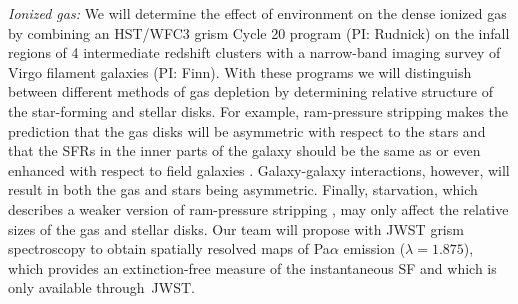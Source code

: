 \documentclass[11pt]{article}
\begin{document}

\textit{Ionized gas:} We will determine the effect of environment on the dense ionized
gas by combining an HST/WFC3 grism Cycle 20 program
(PI: Rudnick) on the infall regions of 4 intermediate redshift
clusters with a narrow-band imaging survey of Virgo filament galaxies (PI: Finn).  With these programs
we will distinguish between different methods of gas depletion by
determining relative structure of the star-forming and stellar disks.
For example, ram-pressure stripping makes the prediction that the gas
disks will be asymmetric \citep[e.g.][]{Quilis00,Crowl05} with respect
to the stars and that the SFRs in the inner parts of the galaxy should
be the same as or even enhanced with respect to field galaxies
\citep{Koopmann04,Weinmann10}.  Galaxy-galaxy interactions, however,
will result in both the gas and stars being asymmetric.  Finally,
starvation, which describes a weaker version of ram-pressure stripping
\citep[e.g.][]{Larson80}, may only affect the relative sizes of the
gas and stellar disks.  Our team will propose with JWST grism spectroscopy to obtain spatially resolved maps of Pa$\alpha$ emission ($\lambda=1.875$\micron), which provides an extinction-free measure of the instantaneous SF and which is only available through~JWST.

\end{document}

